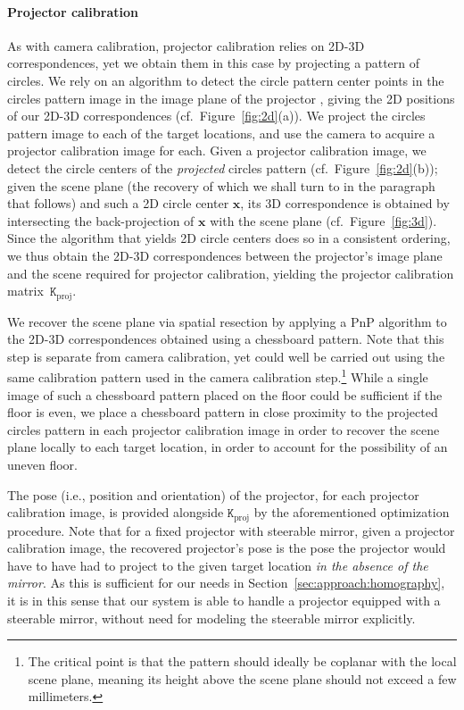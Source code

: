 \documentclass[review]{elsarticle}
\begin{document}
\paragraph{Projector calibration} As with camera calibration, projector calibration relies on 2D-3D correspondences, yet we obtain them in this case by projecting a pattern of circles. We rely on an algorithm to detect the circle pattern center points in the circles pattern image in the image plane of the projector \cite{bradski2000opencv}, giving the 2D positions of our 2D-3D correspondences (cf.\ Figure~\ref{fig:2d}(a)). We project the circles pattern image to each of the target locations, and use the camera to acquire a projector calibration image for each. Given a projector calibration image, we detect the circle centers of the \textit{projected} circles pattern (cf.\ Figure~\ref{fig:2d}(b)); given the scene plane (the recovery of which we shall turn to in the paragraph that follows) and such a 2D circle center $\mathbf{x}$, its 3D correspondence is obtained by intersecting the back-projection of $\mathbf{x}$ with the scene plane (cf.\ Figure~\ref{fig:3d}). Since the algorithm that yields 2D circle centers does so in a consistent ordering, we thus obtain the 2D-3D correspondences between the projector's image plane and the scene required for projector calibration, yielding the projector calibration matrix~$\mathtt{K}_\text{proj}$.

We recover the scene plane via spatial resection by applying a PnP algorithm \cite{terzakis2020consistently} to the 2D-3D correspondences obtained using a chessboard pattern. Note that this step is separate from camera calibration, yet could well be carried out using the same calibration pattern used in the camera calibration step.\footnote{The critical point is that the pattern should ideally be coplanar with the local scene plane, meaning its height above the scene plane should not exceed a few millimeters.} While a single image of such a chessboard pattern placed on the floor could be sufficient if the floor is even, we place a chessboard pattern in close proximity to the projected circles pattern in each projector calibration image in order to recover the scene plane locally to each target location, in order to account for the possibility of an uneven floor.

The pose (i.e., position and orientation) of the projector, for each projector calibration image, is provided alongside $\mathtt{K}_\text{proj}$ by the aforementioned optimization procedure. Note that for a fixed projector with steerable mirror, given a projector calibration image, the recovered projector's pose is the pose the projector would have to have had to project to the given target location \textit{in the absence of the mirror}. As this is sufficient for our needs in Section~\ref{sec:approach:homography}, it is in this sense that our system is able to handle a projector equipped with a steerable mirror, without need for modeling the steerable mirror explicitly.
\end{document}
